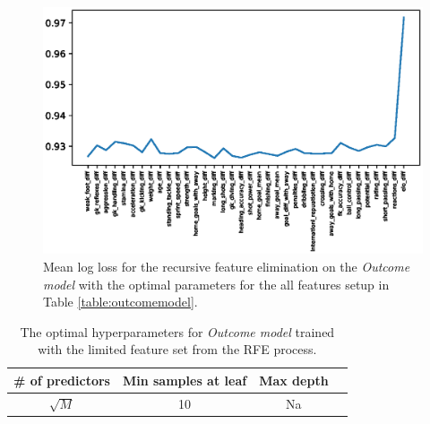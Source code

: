 \begin{figure}[H]
    \centering
    \includegraphics[width=1\textwidth]{img/optimal_avg_lloss.eps}
    \caption{Mean log loss for the recursive feature elimination on the \textit{Outcome model} with the optimal parameters for the all features setup in Table \ref{table:outcomemodel}.}
    \label{fig:optimal_avg_loss}
\end{figure}

\begin{table}
    \caption{\textit{Outcome model's} simulation results using the limited feature set from the RFE process.}
    \label{table:outcomemodel_rfe}
\end{table}

\begin{table}
    \caption{The optimal hyperparameters for \textit{Outcome model} trained with the limited feature set from the RFE process.}
    \begin{tabular}{| c | c| c| c|}
        \hline
         \# of predictors & Min samples at leaf & Max depth\\
        \hline
         $\sqrt{M}$ & 10 & Na \\
        \hline
    \end{tabular}
    \label{table:hyperparam_results_rfe}
\end{table}



